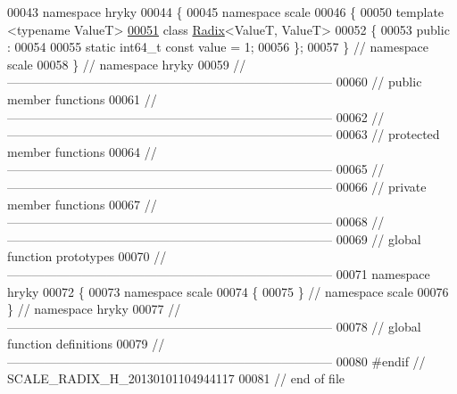 \begin{DoxyCode}
00043 \textcolor{keyword}{namespace }hryky
00044 \{
00045 \textcolor{keyword}{namespace }scale
00046 \{
00050 \textcolor{keyword}{template} <\textcolor{keyword}{typename} ValueT>
\hypertarget{scale__radix_8h_source_l00051}{}\hyperlink{classhryky_1_1scale_1_1_radix_3_01_value_t_00_01_value_t_01_4}{00051} \textcolor{keyword}{class }\hyperlink{classhryky_1_1scale_1_1_radix}{Radix}<ValueT, ValueT>
00052 \{
00053 \textcolor{keyword}{public} :
00054 
00055     \textcolor{keyword}{static} int64\_t \textcolor{keyword}{const} value = 1;
00056 \};
00057 \} \textcolor{comment}{// namespace scale}
00058 \} \textcolor{comment}{// namespace hryky}
00059 \textcolor{comment}{//
      ------------------------------------------------------------------------------}
00060 \textcolor{comment}{// public member functions}
00061 \textcolor{comment}{//
      ------------------------------------------------------------------------------}
00062 \textcolor{comment}{//
      ------------------------------------------------------------------------------}
00063 \textcolor{comment}{// protected member functions}
00064 \textcolor{comment}{//
      ------------------------------------------------------------------------------}
00065 \textcolor{comment}{//
      ------------------------------------------------------------------------------}
00066 \textcolor{comment}{// private member functions}
00067 \textcolor{comment}{//
      ------------------------------------------------------------------------------}
00068 \textcolor{comment}{//
      ------------------------------------------------------------------------------}
00069 \textcolor{comment}{// global function prototypes}
00070 \textcolor{comment}{//
      ------------------------------------------------------------------------------}
00071 \textcolor{keyword}{namespace }hryky
00072 \{
00073 \textcolor{keyword}{namespace }scale
00074 \{
00075 \} \textcolor{comment}{// namespace scale}
00076 \} \textcolor{comment}{// namespace hryky}
00077 \textcolor{comment}{//
      ------------------------------------------------------------------------------}
00078 \textcolor{comment}{// global function definitions}
00079 \textcolor{comment}{//
      ------------------------------------------------------------------------------}
00080 \textcolor{preprocessor}{#endif // SCALE\_RADIX\_H\_20130101104944117}
00081 \textcolor{preprocessor}{}\textcolor{comment}{// end of file}
\end{DoxyCode}
